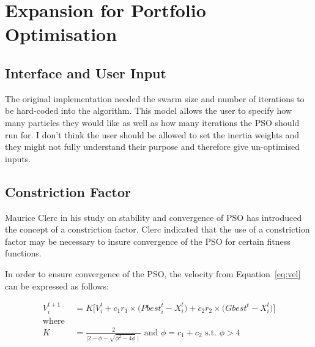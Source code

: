 \documentclass{pdfmx4020}
\begin{document}
  \section{Expansion for Portfolio Optimisation} %
  \label{sec:expansion_for_portfolio_optimisation}

    \subsection{Interface and User Input} %
    \label{sub:interface_and_user_input}
    The original implementation needed the swarm size and number of iterations to be hard-coded into the algorithm. This model allows the user to specify how many particles they would like as well as how many iterations the PSO should run for. I don't think the user should be allowed to set the inertia weights and they might not fully understand their purpose and therefore give un-optimised inputs. 
    
    \subsection{Constriction Factor} %
    \label{sub:constriction_factor}
    Maurice Clerc in his study on stability and convergence of PSO \cite{constriction_factor} has introduced the concept of a constriction factor. Clerc indicated that the use of a constriction factor may be necessary to insure convergence of the PSO for certain fitness functions.

    In order to ensure convergence of the PSO, the velocity from Equation~\ref{eq:vel} can be expressed as follows:

    \begin{equation} \label{eq:cf}
      \begin{split}
        V_{i}^{t+1} & = K \Bigg[ V_{i}^{t} + c_1 r_1 \times \Big( Pbest_{i}^{t} - X_{i}^{t} \Big) + c_2 r_2 \times \Big( Gbest^{t} - X_{i}^{t} \Big) \Bigg] \\
        \text{where }\\
        K & = \frac{2}{\mid 2 - \phi - \sqrt{\phi^2 -4\phi} \mid} \text{ and } \phi = c_1 + c_2 \text{ s.t. } \phi > 4  \\
      \end{split}
    \end{equation}
\end{document}
